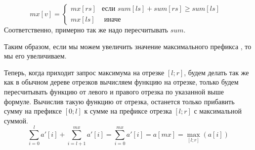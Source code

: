 \documentclass{article}
\begin{document}
\begin{itemize}
\begin{equation*}
    mx[v] = 
    \begin{cases}
    mx[rs] & \text{если $sum[ls] + sum[rs] \geq sum[ls]$ } \\
    mx[ls] & \text{  иначе}
    \end{cases}
\end{equation*}
Соответственно, примерно так же надо пересчитывать $sum$.

Таким образом, если мы можем увеличить значение максимального префикса , то мы его увеличиваем.

Теперь, когда приходит запрос максимума на отрезке $[l;r]$, будем делать так же как в обычном дереве отрезков вычисляем функцию на отрезке, только будем пересчитывать функцию от левого и правого отрезка по указанной выше формуле. Вычислив такую функцию от отрезка, останется только прибавить сумму на префиксе $[0;l]$ к сумме на префиксе отрезка $[l;r]$ с максимальной суммой. $$\sum_{i = 0}^{l}a'[i] + \sum_{i = l + 1}^{mx}a'[i] = \sum_{i = 0}^{mx}a'[i] = a[mx] = \max\limits_{[l;r]}(a[i])$$
\end{itemize}
\end{document}
